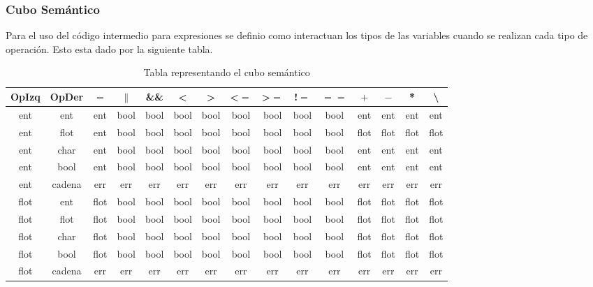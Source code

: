 \subsubsection{Cubo Semántico}
Para el uso del código intermedio para expresiones se definio como interactuan los tipos de las variables cuando se realizan cada tipo de operación. Esto esta dado por la siguiente tabla.

\begin{table}
    \centering
    \caption{Tabla representando el cubo semántico}
    \small
    \begin{tabular}{||c c || c c c c c c c c c c c c c||} 
         
         OpIzq & OpDer & $=$ & $\parallel$ & \&\& & \textless & \textgreater & \textless $=$ & \textgreater $=$ & !$=$ & $==$ & $+$ & $-$ & * & \textbackslash \\ [0.5ex] 
         \hline\hline
         ent & ent & ent & bool & bool & bool & bool & bool & bool & bool & bool & ent & ent & ent & ent \\ 
         \hline
         ent & flot & ent & bool & bool & bool & bool & bool & bool & bool & bool & flot & flot & flot & flot \\ 
         \hline
         ent & char & ent & bool & bool & bool & bool & bool & bool & bool & bool & ent & ent & ent & ent \\ 
         \hline
         ent & bool & ent & bool & bool & bool & bool & bool & bool & bool & bool & ent & ent & ent & ent \\ 
         \hline
         ent & cadena & err & err & err & err & err & err & err & err & err & err & err & err & err \\ 
         \hline
         flot & ent & flot & bool & bool & bool & bool & bool & bool & bool & bool & flot & flot & flot & flot \\ 
         \hline
         flot & flot & flot & bool & bool & bool & bool & bool & bool & bool & bool & flot & flot & flot & flot \\ 
         \hline
         flot & char & flot & bool & bool & bool & bool & bool & bool & bool & bool & flot & flot & flot & flot \\ 
         \hline
         flot & bool & flot & bool & bool & bool & bool & bool & bool & bool & bool & flot & flot & flot & flot \\ 
         \hline
         flot & cadena & err & err & err & err & err & err & err & err & err & err & err & err & err \\ 
         \hline

\end{tabular}
\end{table}
